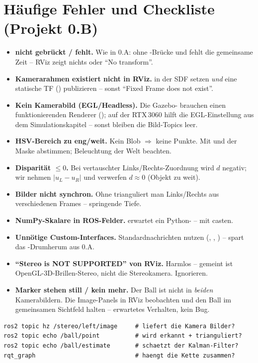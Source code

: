 \section{Häufige Fehler und Checkliste (Projekt 0.B)}
\begin{warnbox}[title={Stolpersteine -- vieles aus 0.A übertragbar}]
\begin{itemize}
\item \textbf{ nicht gebrückt /  fehlt.} Wie in
  0.A: ohne -Brücke und  fehlt die
  gemeinsame Zeit -- RViz zeigt nichts oder ``No transform''.
\item \textbf{Kamerarahmen existiert nicht in RViz.} 
  in der SDF setzen \emph{und} eine statische TF () publizieren -- sonst ``Fixed Frame does not exist''.
\item \textbf{Kein Kamerabild (EGL/Headless).} Die Gazebo- brauchen
  einen funktionierenden Renderer (); auf der RTX\,3060 hilft die
  EGL-Einstellung aus dem Simulationskapitel -- sonst bleiben die Bild-Topics leer.
\item \textbf{HSV-Bereich zu eng/weit.} Kein Blob $\Rightarrow$ keine Punkte. Mit
   und der Maske abstimmen; Beleuchtung der Welt beachten.
\item \textbf{Disparität $\le 0$.} Bei vertauschter Links/Rechts-Zuordnung wird
  $d$ negativ; wir nehmen $|u_L-u_R|$ und verwerfen $d\approx 0$ (Objekt zu weit).
\item \textbf{Bilder nicht synchron.} Ohne 
  trianguliert man Links/Rechts aus verschiedenen Frames -- springende Tiefe.
\item \textbf{NumPy-Skalare in ROS-Felder.}  erwartet ein
  Python- -- mit  casten.
\item \textbf{Unnötige Custom-Interfaces.} Standardnachrichten nutzen
  (, , ) --
  spart das -Drumherum aus 0.A.
\item \textbf{``Stereo is NOT SUPPORTED'' von RViz.} Harmlos -- gemeint ist
  OpenGL-3D-Brillen-Stereo, nicht die Stereokamera. Ignorieren.
\item \textbf{Marker stehen still / kein  mehr.} Der Ball ist
  nicht in \emph{beiden} Kamerabildern. Die Image-Panels in RViz beobachten und
  den Ball im gemeinsamen Sichtfeld halten -- erwartetes Verhalten, kein Bug.
\end{itemize}
\end{warnbox}
\begin{infobox}[title=Schnelle Prüfbefehle]
\begin{lstlisting}[style=bash]
ros2 topic hz /stereo/left/image     # liefert die Kamera Bilder?
ros2 topic echo /ball/point          # wird erkannt + trianguliert?
ros2 topic echo /ball/estimate       # schaetzt der Kalman-Filter?
rqt_graph                            # haengt die Kette zusammen?
\end{lstlisting}
\end{infobox}

